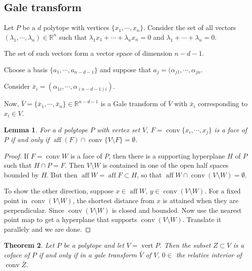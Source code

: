 \documentclass[a4paper,10pt,landscape]{article}
\newtheorem{theorem}{Theorem}[section]
\newtheorem{lemma}[theorem]{Lemma}
\def\R{\mathbb{R}}
\def\conv{\operatorname{conv}}
\def\aff{\operatorname{aff}}
\def\verti{\operatorname{vert}}
\begin{document}
\begin{multicols}{3}
    \section{Gale transform}
    Let $P$ be a $d$ polytope with vertices $\{x_1, \cdots, x_n\}$. Consider the
    set of all vectors $(\lambda_1, \cdots, \lambda_n) \in \R^n$ such that
    $\lambda_1 x_1 + \cdots + \lambda_n x_n = 0$ and $\lambda_1+ \cdots +
    \lambda_n = 0$.

    The set of such vectors form a vector space of dimension $n - d- 1$.

    Choose a basis $\{a_1, \cdots, a_{n-d-1}\}$ and suppose that $a_{j} =
    (\alpha_{j1}, \cdots, \alpha_{jn}$.

    Consider $\bar{x}_i = (\alpha_{1i}, \cdots, \alpha_{(n - d - 1)i})$.

    Now, $\bar{V} = \{\bar{x}_1,\cdots, \bar{x}_n \} \in \R^{n-d-1}$ is a Gale
    transform of $\bar{V}$ with $\bar{x}_i$ corresponding to $x_i \in V$.

    \begin{lemma}
      For a $d$ polytope $P$ with vertex set $V$, $F = \conv \{x_i, \cdots,
      x_j\}$ is a face of $P$ if and only if $\aff(F) \cap \conv \{V \setminus
      F\} = \emptyset$.
  \end{lemma}

  \begin{proof}
    If $F = \conv W$ is a face of $P$, then there is a supporting hyperplane $H$
    of $P$ such that $H \cap P = F$. Then $V \setminus W$ is contained  in one
    of the open half spaces bounded by $H$. But then $\aff W = \aff F \subset
    H$, so that $\aff W \cap \conv(V \setminus W) = \emptyset$.

    To show the other direction, suppose $x \in \aff W$, $y \in \conv (V
    \setminus W)$. For a fixed point in $\conv (V \setminus W)$, the shortest
    distance from $x$ is attained when they are perpendicular. Since $\conv (V
    \setminus W)$ is closed and bounded. Now use the nearest point map to get a
    hyperplane that supports $\conv (V \setminus W)$. Translate it parallely and
    we are done.
  \end{proof}

  \begin{theorem}
    Let $P$ be a polytope and let $V =\verti P$. Then the subset $Z \subset V$ is
    a coface of $P$ if and only if in a gale transform $\bar{V}$ of $V$, $0 \in$
    the relative interior of $\conv \bar{Z}$.
  \end{theorem}


\end{multicols}
\end{document}
